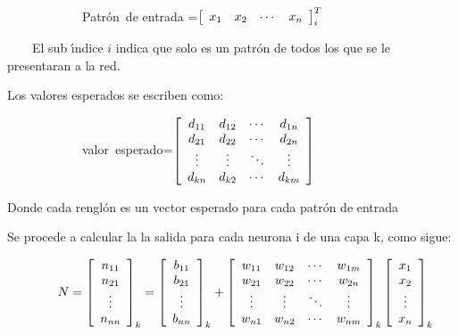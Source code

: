 $\qquad\qquad\qquad$Patr\'{o}n\ de entrada =$\left[
\begin{array}
[c]{cccc}%
x_{1} & x_{2} & \cdots & x_{n}%
\end{array}
\right]  _{i}^{T}$

\ \ \ \ El sub \'{\i}ndice $i$ indica que solo es un patr\'{o}n de todos los
que se le presentaran a la red.

Los valores esperados se escriben como:

\bigskip$\qquad\qquad\qquad$valor\ esperado=$\left[
\begin{array}
[c]{cccc}%
d_{11} & d_{12} & \cdots & d_{1n}\\
d_{21} & d_{22} & \cdots & d_{2n}\\
\vdots & \vdots & \ddots & \vdots\\
d_{kn} & d_{k2} & \cdots & d_{km}%
\end{array}
\right]  $

Donde cada rengl\'{o}n es un vector esperado para cada patr\'{o}n de entrada

\bigskip

Se procede a calcular la la salida para cada neurona i de \bigskip una capa k,
como sigue:

\bigskip$\qquad\qquad N=\left[
\begin{array}
[c]{c}%
n_{11}\\
n_{21}\\
\vdots\\
n_{nn}%
\end{array}
\right]  _{k}=\left[
\begin{array}
[c]{c}%
b_{11}\\
b_{21}\\
\vdots\\
b_{nn}%
\end{array}
\right]  _{k}+\left[
\begin{array}
[c]{cccc}%
w_{11} & w_{12} & \cdots & w_{1m}\\
w_{21} & w_{22} & \cdots & w_{2n}\\
\vdots & \vdots & \ddots & \vdots\\
w_{n1} & w_{n2} & \cdots & w_{nm}%
\end{array}
\right]  _{k}\left[
\begin{array}
[c]{c}%
x_{1}\\
x_{2}\\
\vdots\\
x_{n}%
\end{array}
\right]  _{k}$

